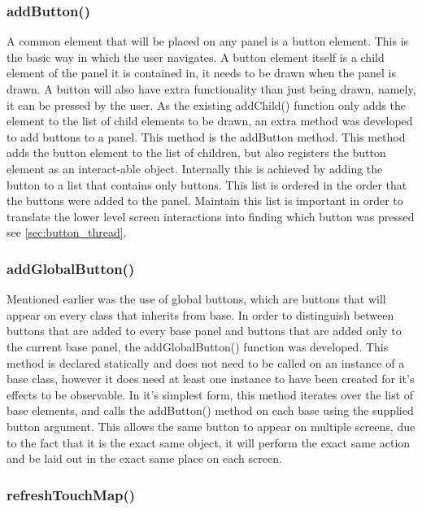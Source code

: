 \subsubsection{addButton()}

A common element that will be placed on any panel is a button element. This is the basic way in which the user navigates. A button element itself is a child element of the panel it is contained in, it needs to be drawn when the panel is drawn. A button will also have extra functionality than just being drawn, namely, it can be pressed by the user. As the existing addChild() function only adds the element to the list of child elements to be drawn, an extra method was developed to add buttons to a panel. This method is the addButton method. This method adds the button element to the list of children, but also registers the button element as an interact-able object. Internally this is achieved by adding the button to a list that contains only buttons. This list is ordered in the order that the buttons were added to the panel. Maintain this list is important in order to translate the lower level screen interactions into finding which button was pressed see \ref{sec:button_thread}.

\subsubsection{addGlobalButton()}

Mentioned earlier was the use of global buttons, which are buttons that will appear on every class that inherits from base. In order to distinguish between buttons that are added to every base panel and buttons that are added only to the current base panel, the addGlobalButton() function was developed. This method is declared statically and does not need to be called on an instance of a base class, however it does need at least one instance to have been created for it's effects to be observable. In it's simplest form, this method iterates over the list of base elements, and calls the addButton() method on each base using the supplied button argument. This allows the same button to appear on multiple screens, due to the fact that it is the exact same object, it will perform the exact same action and be laid out in the exact same place on each screen.

\subsubsection{refreshTouchMap()}

